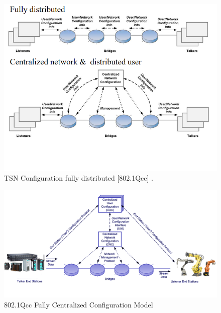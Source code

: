 \begin{itemize}
    \begin{figure}
    \centering
    \includegraphics[scale=0.65]{images/TSN Configuration fully distributed [802.1Qcc].png} 
    \caption{TSN Configuration fully distributed [802.1Qcc] \cite{TSN2019_study}.}
    \label{fig:TSN_Configuration_fullydistributed[802.1Qcc]}
     \end{figure}
    
    
    \begin{figure}
    \centering
    \includegraphics[scale=0.22]{images/802.1Qcc Fully Centralized Configuration Model.png} 
    \caption{802.1Qcc Fully Centralized Configuration Model \cite{Ginthor2019}}
    \label{fig:802.1Qcc_Fully_Centralized_Configuration_Model}
    \end{figure}



\end{itemize}
